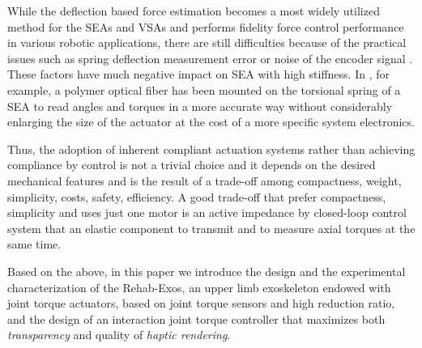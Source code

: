 While the deflection based force estimation becomes a most widely utilized method for the SEAs and VSAs and performs fidelity force control performance in various robotic applications, there are still difficulties because of the practical issues such as spring deflection measurement error or noise of the encoder signal \cite{lee2018integrated}. These factors have much negative impact on SEA with high stiffness. In \cite{leal2018polymer}, for example, a polymer optical fiber has been mounted on the torsional spring of a SEA to read angles and torques in a more accurate way without considerably enlarging the size of the actuator at the cost of a more specific system electronics.
\par Thus, the adoption of inherent compliant actuation systems rather than achieving compliance by control  is not a trivial choice and it depends on the desired mechanical features and is the result of a trade-off among compactness, weight, simplicity, costs, safety, efficiency.
A good trade-off that prefer compactness, simplicity and uses just one motor is an active impedance by closed-loop control  system that  an elastic component to transmit and to measure axial torques at the same time.


\par 
Based on the above, in this paper 
we introduce the design and the experimental characterization of the Rehab-Exos, an upper limb exoskeleton endowed with  joint torque actuators, based on  joint torque sensors and high reduction ratio, and the design of an  interaction joint torque controller that maximizes both  {\em transparency } and  quality of {\em haptic rendering}.



